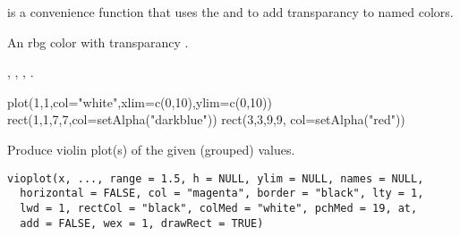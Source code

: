 \documentclass[a4paper]{book}
\begin{document}
%
\begin{Details}\relax
{} is a convenience function that uses the  and  to add transparancy to named colors.
\end{Details}
%
\begin{Value}
An rbg color with transparancy .
\end{Value}
%
\begin{SeeAlso}\relax
{}, , , .
\end{SeeAlso}
%
\begin{Examples}
\begin{ExampleCode}
plot(1,1,col="white",xlim=c(0,10),ylim=c(0,10))
rect(1,1,7,7,col=setAlpha("darkblue"))
rect(3,3,9,9, col=setAlpha("red"))

\end{ExampleCode}
\end{Examples}
%
\begin{Description}\relax
Produce violin plot(s) of the given (grouped) values.
\end{Description}
%
\begin{Usage}
\begin{verbatim}
vioplot(x, ..., range = 1.5, h = NULL, ylim = NULL, names = NULL,
  horizontal = FALSE, col = "magenta", border = "black", lty = 1,
  lwd = 1, rectCol = "black", colMed = "white", pchMed = 19, at,
  add = FALSE, wex = 1, drawRect = TRUE)
\end{verbatim}
\end{Usage}
%
\end{document}
